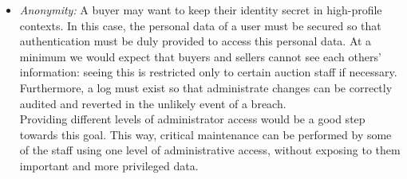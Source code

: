 \documentclass[titlepage, 12pt]{extarticle}
\begin{document}
\begin{itemize}
\begin{enumerate}
  \end{enumerate}
\item {\it Anonymity:} A buyer may want to keep their identity secret in high-profile contexts. In this case, the personal data of a user must be secured so that authentication must be duly provided to access this personal data. At a minimum we would expect that buyers and sellers cannot see each others' information: seeing this is restricted only to certain auction staff if necessary. Furthermore, a log must exist so that administrate changes can be correctly audited and reverted in the unlikely event of a breach.
\\Providing different levels of administrator access would be a good step towards this goal. This way, critical maintenance can be performed by some of the staff using one level of administrative access, without exposing to them important and more privileged data.
\end{itemize}
\end{document}
